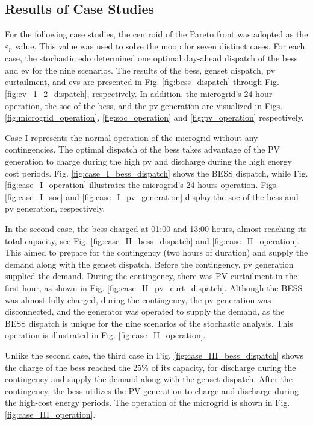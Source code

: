 \documentclass[preprint, 10pt, 5p]{elsarticle}
\begin{document}
\subsection{Results of Case Studies}

For the following case studies, the centroid of the Pareto front was 
adopted as the $\varepsilon_{p}$ value. This value was used to solve the
\gls{moop} for seven distinct cases. For each case, the stochastic \gls{edo}
determined one optimal day-ahead dispatch of the \gls{bess} and \gls{ev} 
for the nine scenarios. 
The results of the \gls{bess}, genset dispatch, \gls{pv} curtailment, 
and \glspl{ev} are presented in Fig. \ref{fig:bess_dispatch} through 
Fig. \ref{fig:ev_1_2_dispatch}, respectively. 
In addition, the microgrid's 24-hour operation, the \gls{soc} of 
the \gls{bess}, and the \gls{pv} generation are visualized in Figs.
\ref{fig:microgrid_operation}, \ref{fig:soc_operation} and 
\ref{fig:pv_operation} respectively. 

Case I represents the normal operation of the microgrid 
without any contingencies. The optimal dispatch of the \gls{bess} takes 
advantage of the PV generation to charge during the high \gls{pv} and 
discharge during the high energy cost periods.
Fig. \ref{fig:case_I_bess_dispatch} shows the BESS dispatch, while
Fig. \ref{fig:case_I_operation} illustrates the microgrid's 24-hours 
operation. Figs. \ref{fig:case_I_soc} and \ref{fig:case_I_pv_generation} 
display the \gls{soc} of the \gls{bess} and \gls{pv} generation, respectively.

In the second case, the \gls{bess} charged at 01:00 and 13:00 hours, almost
reaching its total capacity, see Fig. \ref{fig:case_II_bess_dispatch} 
and \ref{fig:case_II_operation}. This aimed to prepare for the contingency 
(two hours of duration) and supply the demand along with the \gls{genset} 
dispatch. Before the contingency, \gls{pv} generation supplied the demand. 
During the contingency, there was PV curtailment in the first hour, as 
shown in Fig. \ref{fig:case_II_pv_curt_dispatch}. Although the BESS was 
almost fully charged, during the contingency, the \gls{pv} generation was 
disconnected, and the generator was operated to supply the demand, as the 
BESS dispatch is unique for the nine scenarios of the stochastic analysis. 
This operation is illustrated in Fig. \ref{fig:case_II_operation}.

Unlike the second case, the third case in Fig. \ref{fig:case_III_bess_dispatch} 
shows the charge of the \gls{bess} reached the 25\% of its capacity, 
for discharge during the contingency and supply the demand along with the 
genset dispatch. After the contingency, the \gls{bess} utilizes the 
PV generation to charge and discharge during the high-cost energy periods. 
The operation of the microgrid is shown in Fig. \ref{fig:case_III_operation}.
\end{document}
